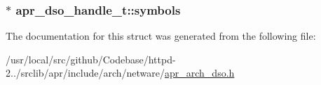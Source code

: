 \subsubsection[{\texorpdfstring{symbols}{symbols}}]{$\ast$ apr\+\_\+dso\+\_\+handle\+\_\+t\+::symbols}\hypertarget{structapr__dso__handle__t_a75493ee1847724a7de3223e4d21316ad}{}\label{structapr__dso__handle__t_a75493ee1847724a7de3223e4d21316ad}


The documentation for this struct was generated from the following file\+:\begin{DoxyCompactItemize}
\item 
/usr/local/src/github/\+Codebase/httpd-\/2../srclib/apr/include/arch/netware/\hyperlink{netware_2apr__arch__dso_8h}{apr\+\_\+arch\+\_\+dso.\+h}\end{DoxyCompactItemize}
